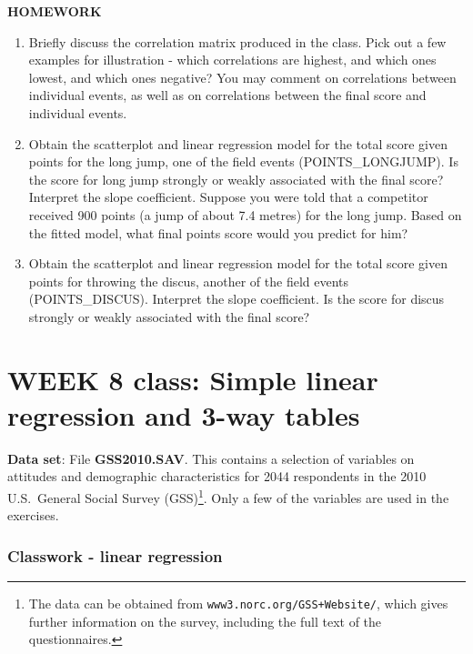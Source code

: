 \textbf{HOMEWORK}

\begin{enumerate}
\vspace*{-1ex}
\item
Briefly discuss the correlation matrix produced in the class. Pick out a few
examples for illustration - which correlations are highest, and which ones lowest,
and which ones negative? You may comment on correlations between individual events, as
well as on correlations between the final score and individual events.
\item
Obtain the scatterplot and linear regression model for
the total score given points for the long jump, one of the
field events (POINTS\_LONGJUMP). Is the
score for long jump strongly or weakly associated with the final score?
Interpret the slope coefficient. Suppose you were told that a competitor received
900 points (a jump of about 7.4 metres) for the long jump.
Based on the fitted model, what final points score would you predict for
him?
\item
Obtain the scatterplot and linear regression model for
the total score given points for throwing the discus, another of the
field events (POINTS\_DISCUS). Interpret the slope coefficient. Is the
score for discus strongly or weakly associated with the final score?
\end{enumerate}


\newpage

\section[Week 9: Simple linear regression 2]{WEEK 8 class: Simple linear
regression and 3-way tables}

\textbf{Data set}: File \textbf{GSS2010.SAV}. This contains a
selection of variables on attitudes and demographic characteristics for
2044 respondents in the 2010 U.S.\ General Social Survey
(GSS)\footnote{The data can be obtained from
\texttt{www3.norc.org/GSS+Website/}, which gives further information on
the survey, including the full text of the questionnaires. }. Only a few
of the variables are used in the exercises.

\subsubsection{Classwork - linear regression}


